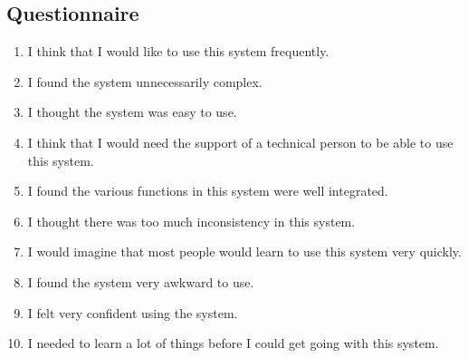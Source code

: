\subsection{Questionnaire}
\begin{enumerate} 
	\item 	I think that I would like to use this system frequently.
	\item 	I found the system unnecessarily complex.
	\item 	I thought the system was easy to use.
	\item 	I think that I would need the support of a technical person to be able to use this system.
	\item 	I found the various functions in this system were well integrated.
	\item 	I thought there was too much inconsistency in this system.
	\item   I would imagine that most people would learn to use this system very quickly.
	\item 	I found the system very awkward to use.
	\item 	I felt very confident using the system.
	\item 	I needed to learn a lot of things before I could get going with this system.
\end{enumerate} 
